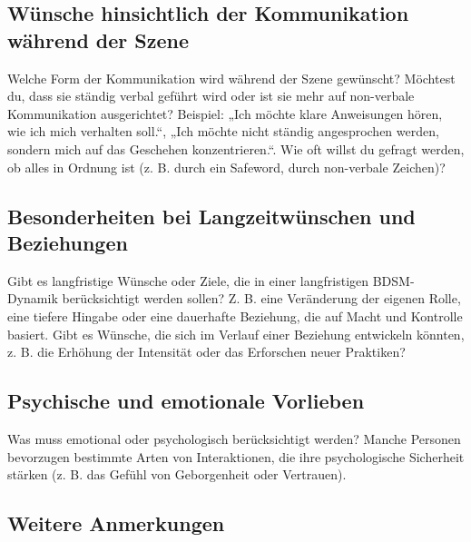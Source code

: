 \documentclass[a4paper,12pt]{article}
\begin{document}
\newpage

\subsection{Wünsche hinsichtlich der Kommunikation während der Szene}
\noindent Welche Form der Kommunikation wird während der Szene gewünscht? Möchtest du, dass sie ständig verbal geführt wird oder ist sie mehr auf non-verbale Kommunikation ausgerichtet? Beispiel: „Ich möchte klare Anweisungen hören, wie ich mich verhalten soll.“, „Ich möchte nicht ständig angesprochen werden, sondern mich auf das Geschehen konzentrieren.“. Wie oft willst du gefragt werden, ob alles in Ordnung ist (z. B. durch ein Safeword, durch non-verbale Zeichen)? \newline
\noindent \TextField[name=WuenscheKomm,multiline=true,height=20em, width=37em]{}

\subsection{Besonderheiten bei Langzeitwünschen und Beziehungen}
\noindent Gibt es langfristige Wünsche oder Ziele, die in einer langfristigen BDSM-Dynamik berücksichtigt werden sollen? Z. B. eine Veränderung der eigenen Rolle, eine tiefere Hingabe oder eine dauerhafte Beziehung, die auf Macht und Kontrolle basiert. Gibt es Wünsche, die sich im Verlauf einer Beziehung entwickeln könnten, z. B. die Erhöhung der Intensität oder das Erforschen neuer Praktiken? \newline
\noindent \TextField[name=WuenscheLangzeit,multiline=true,height=15em, width=37em]{}

\newpage
\subsection{Psychische und emotionale Vorlieben}
\noindent Was muss emotional oder psychologisch berücksichtigt werden? Manche Personen bevorzugen bestimmte Arten von Interaktionen, die ihre psychologische Sicherheit stärken (z. B. das Gefühl von Geborgenheit oder Vertrauen).\newline
\noindent \TextField[name=WuenschePsych,multiline=true,height=20em, width=37em]{}
    
\subsection{Weitere Anmerkungen}
\noindent \TextField[name=WuenscheWeiteres,multiline=true,height=20em, width=37em]{}
\end{document}
